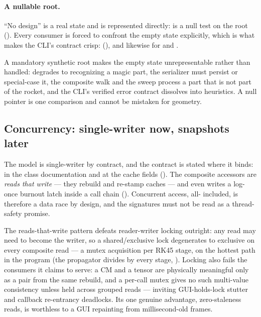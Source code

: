 \paragraph{A nullable root.}
``No design'' is a real state and is represented directly:  is a null
test on the root (). Every consumer is forced to
confront the empty state explicitly, which is what makes the CLI's contract crisp:
 (), and
likewise for  and .

\begin{rejected}
A mandatory synthetic root makes the empty state unrepresentable rather than handled:
 degrades to recognizing a magic part, the serializer must persist or
special-case it, the composite walk and the sweep process a part that is not part of the
rocket, and the CLI's verified  error contract dissolves into
heuristics. A null pointer is one comparison and cannot be mistaken for geometry.
\end{rejected}

\subsection{Concurrency: single-writer now, snapshots later}\label{sec:tradeoffs-threading}

The model is single-writer by contract, and the contract is stated where it binds: in the
 class documentation and at the  cache fields
(). The  composite accessors are
\emph{reads that write} --- they rebuild and re-stamp  caches --- and even
 writes a  log-once burnout latch inside a 
call chain (). Concurrent access, all-
included, is therefore a data race by design, and the signatures must not be read as a
thread-safety promise.

\begin{rejected}
The reads-that-write pattern defeats reader-writer locking outright: any read may need
to become the writer, so a shared/exclusive lock degenerates to exclusive on every
composite read --- a mutex acquisition per RK45 stage, on the hottest path in the
program (the propagator divides by  every stage,
). Locking also fails the consumers it claims to serve:
a CM and a tensor are physically meaningful only as a pair from the same rebuild, and a
per-call mutex gives no such multi-value consistency unless held across grouped reads
--- inviting GUI-holds-lock stutter and callback re-entrancy deadlocks. Its one genuine
advantage, zero-staleness reads, is worthless to a GUI repainting from millisecond-old
frames.
\end{rejected}

